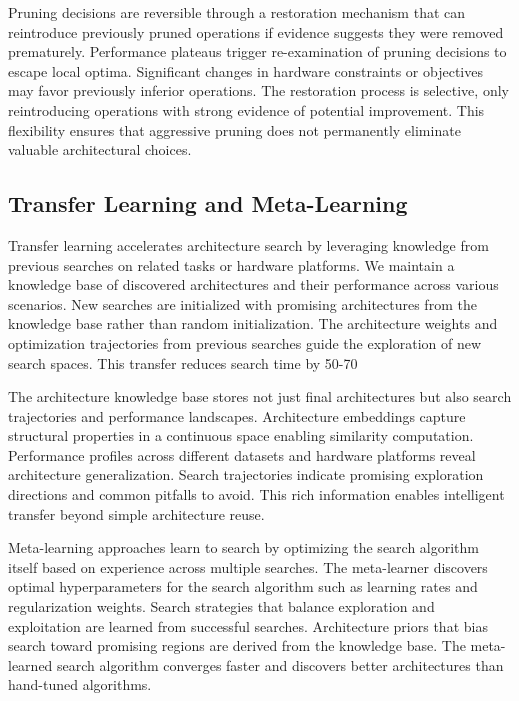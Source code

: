 \documentclass[journal]{IEEEtran}
\begin{document}
Pruning decisions are reversible through a restoration mechanism that can reintroduce previously pruned operations if evidence suggests they were removed prematurely. Performance plateaus trigger re-examination of pruning decisions to escape local optima. Significant changes in hardware constraints or objectives may favor previously inferior operations. The restoration process is selective, only reintroducing operations with strong evidence of potential improvement. This flexibility ensures that aggressive pruning does not permanently eliminate valuable architectural choices.

\subsection{Transfer Learning and Meta-Learning}

Transfer learning accelerates architecture search by leveraging knowledge from previous searches on related tasks or hardware platforms. We maintain a knowledge base of discovered architectures and their performance across various scenarios. New searches are initialized with promising architectures from the knowledge base rather than random initialization. The architecture weights and optimization trajectories from previous searches guide the exploration of new search spaces. This transfer reduces search time by 50-70%

The architecture knowledge base stores not just final architectures but also search trajectories and performance landscapes. Architecture embeddings capture structural properties in a continuous space enabling similarity computation. Performance profiles across different datasets and hardware platforms reveal architecture generalization. Search trajectories indicate promising exploration directions and common pitfalls to avoid. This rich information enables intelligent transfer beyond simple architecture reuse.

Meta-learning approaches learn to search by optimizing the search algorithm itself based on experience across multiple searches. The meta-learner discovers optimal hyperparameters for the search algorithm such as learning rates and regularization weights. Search strategies that balance exploration and exploitation are learned from successful searches. Architecture priors that bias search toward promising regions are derived from the knowledge base. The meta-learned search algorithm converges faster and discovers better architectures than hand-tuned algorithms.
\end{document}
